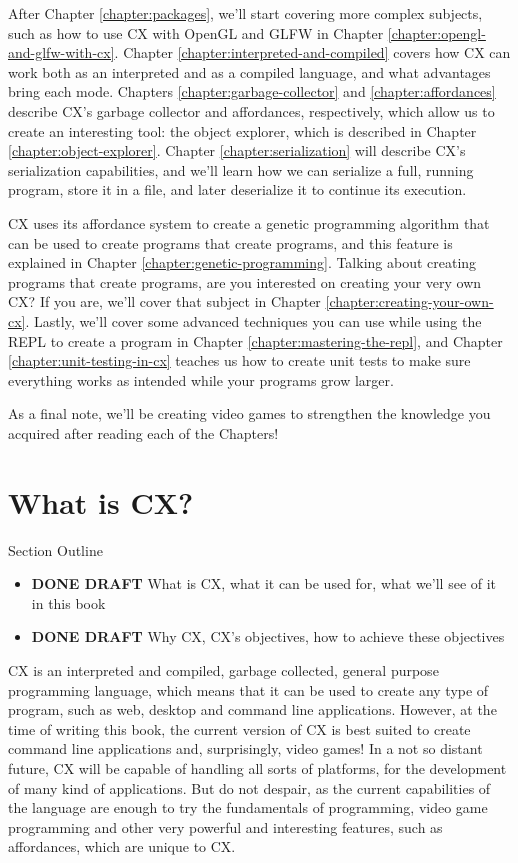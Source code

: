 \documentclass[11pt,fleqn,openany]{book} %
\begin{document}
After Chapter \ref{chapter:packages}, we'll start covering more complex subjects, such as how to use CX with OpenGL and GLFW in Chapter \ref{chapter:opengl-and-glfw-with-cx}. Chapter \ref{chapter:interpreted-and-compiled} covers how CX can work both as an interpreted and as a compiled language, and what advantages bring each mode. Chapters \ref{chapter:garbage-collector} and \ref{chapter:affordances} describe CX's garbage collector and affordances, respectively, which allow us to create an interesting tool: the object explorer, which is described in Chapter \ref{chapter:object-explorer}. Chapter \ref{chapter:serialization} will describe CX's serialization capabilities, and we'll learn how we can serialize a full, running program, store it in a file, and later deserialize it to continue its execution.

CX uses its affordance system to create a genetic programming algorithm that can be used to create programs that create programs, and this feature is explained in Chapter \ref{chapter:genetic-programming}. Talking about creating programs that create programs, are you interested on creating your very own CX? If you are, we'll cover that subject in Chapter \ref{chapter:creating-your-own-cx}. Lastly, we'll cover some advanced techniques you can use while using the REPL to create a program in Chapter \ref{chapter:mastering-the-repl}, and Chapter \ref{chapter:unit-testing-in-cx} teaches us how to create unit tests to make sure everything works as intended while your programs grow larger.

As a final note, we'll be creating video games to strengthen the knowledge you acquired after reading each of the Chapters!

\section{What is CX?}

\begin{remark}
Section Outline
    \begin{itemize}
    \item \textbf{DONE DRAFT} What is CX, what it can be used for, what we'll see of it in this book
    \item \textbf{DONE DRAFT} Why CX, CX's objectives, how to achieve these objectives
    \end{itemize}
\end{remark}

CX is an interpreted and compiled, garbage collected, general purpose programming language, which means that it can be used to create any type of program, such as web, desktop and command line applications. However, at the time of writing this book, the current version of CX is best suited to create command line applications and, surprisingly, video games! In a not so distant future, CX will be capable of handling all sorts of platforms, for the development of many kind of applications. But do not despair, as the current capabilities of the language are enough to try the fundamentals of programming, video game programming and other very powerful and interesting features, such as affordances, which are unique to CX.
\end{document}
